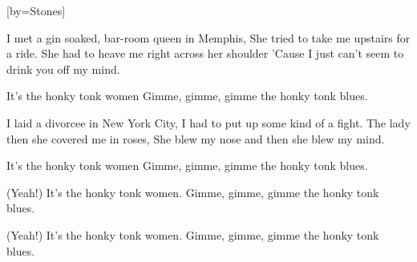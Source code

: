 

[by=Stones]

\begin{LARGE}

\beginverse
I met a gin soaked, bar-room queen in Memphis,
She tried to take me upstairs for a ride.
She had to heave me right across her shoulder
'Cause I just can't seem to drink you off my mind.
\endverse

\beginchorus
It's the honky tonk women
Gimme, gimme, gimme the honky tonk blues.
\endchorus

\beginverse
I laid a divorcee in New York City,
I had to put up some kind of a fight.
The lady then she covered me in roses,
She blew my nose and then she blew my mind.
\endverse

\beginchorus
It's the honky tonk women
Gimme, gimme, gimme the honky tonk blues.

(Yeah!) It's the honky tonk women.
Gimme, gimme, gimme the honky tonk blues.

(Yeah!) It's the honky tonk women.
Gimme, gimme, gimme the honky tonk blues.
\endchorus


\end{LARGE}

\chordson
\endsong
